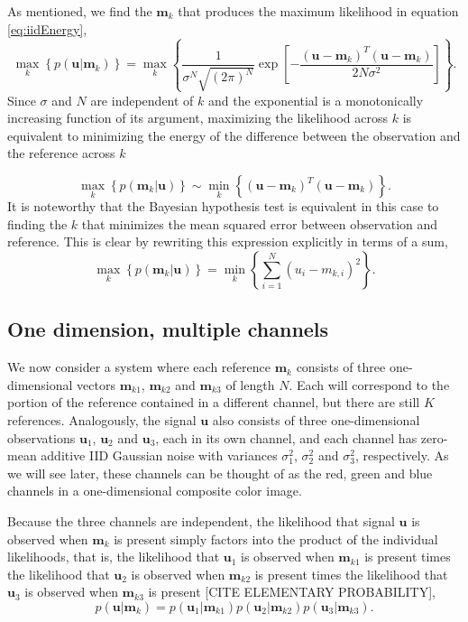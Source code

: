 As mentioned, we find the $\mathbf{m}_k$ that produces the maximum likelihood in equation \ref{eq:iidEnergy},
\begin{equation}
\max_k   \left\{ p(\mathbf{u}|\mathbf{m}_k) \right\} =  \max_k  \left\{ \frac{1}{   \sigma^N\sqrt{ (2\pi)^N}  } \exp\left[ -\frac{(\mathbf{u}-\mathbf{m}_k)^T(\mathbf{u}-\mathbf{m}_k)} {2 N \sigma^2 } \right] \right\}. 
\end{equation}
Since $\sigma$ and $N$ are independent of $k$ and the exponential is a monotonically increasing function of its argument, maximizing the likelihood across $k$ is equivalent to minimizing the energy of the difference between the observation and the reference across $k$ 

\begin{equation}
\max_k   \left\{ p(\mathbf{m}_k|\mathbf{u}) \right\} \sim \min_k  \left\{ (\mathbf{u}-\mathbf{m}_k)^T(\mathbf{u}-\mathbf{m}_k) \right\}. 
\end{equation}
It is noteworthy that the Bayesian hypothesis test is equivalent in this case to finding the $k$ that minimizes the mean squared error between observation and reference. This is clear by rewriting this expression explicitly in terms of a sum,
\begin{equation}
\max_k   \left\{ p(\mathbf{m}_k|\mathbf{u}) \right\} =  \min_k  \left\{ \sum_{i=1}^N  (u_i-m_{k,i})^2   \right\}. 
\end{equation}

\subsection{One dimension, multiple channels}\label{sec:simpleModel}
We now consider a system where each reference $\mathbf{m}_k$ consists of three one-dimensional vectors $\mathbf{m}_{k1}$, $\mathbf{m}_{k2}$ and $\mathbf{m}_{k3}$ of length $N$. Each will correspond to the portion of the reference contained in a different channel, but there are still $K$ references. Analogously, the signal $\mathbf{u}$ also consists of three one-dimensional observations $\mathbf{u}_1$, $\mathbf{u}_2$ and $\mathbf{u}_3$, each in its own channel, and each channel has zero-mean additive IID Gaussian noise with variances $\sigma_1^2$, $\sigma_2^2$ and $\sigma_3^2$, respectively. As we will see later, these channels can be thought of as the red, green and blue channels in a one-dimensional composite color image. 

Because the three channels are independent, the likelihood that signal $\mathbf{u}$ is observed when $\mathbf{m}_k$ is present simply factors into the product of the individual likelihoods, that is, the likelihood that $\mathbf{u}_1$ is observed when $\mathbf{m}_{k1}$ is present times the likelihood that $\mathbf{u}_2$ is observed when $\mathbf{m}_{k2}$ is present times the likelihood that $\mathbf{u}_3$ is observed when $\mathbf{m}_{k3}$ is present [CITE ELEMENTARY PROBABILITY],
\begin{equation}
p(\mathbf{u}|\mathbf{m}_k) = p(\mathbf{u}_1|\mathbf{m}_{k1})p(\mathbf{u}_2|\mathbf{m}_{k2})p(\mathbf{u}_3|\mathbf{m}_{k3}).
\end{equation}

